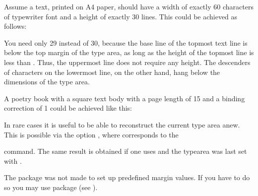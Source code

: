\begin{Example}
  Assume a text, printed on A4 paper, should have a width of exactly 60
  characters of typewriter font and a height of exactly 30 lines. This could
  be achieved as follows:
You need only 29 instead of 30, because the base line of the topmost
text line is  below the top margin of the type area, as
long as the height of the topmost line is less than
. Thus, the uppermost line does not require any
height. The descenders of characters on the lowermost line, on the
other hand, hang below the dimensions of the type area.

\item A poetry book with a square text body with a page length of
  15 and a binding correction of 1 could be
  achieved like this:
\end{Example}
\EndIndexGroup


\begin{Declaration}
\end{Declaration}%
In rare cases it is useful to be able to
reconstruct the current type area anew. This is possible via the option
, where
corresponds to the
\begin{lstcode}
  \areaset[current]{\textwidth}{\textheight}
\end{lstcode}
command. The same result is obtained if one uses
 and the typearea was last set with
.%
%
\EndIndexGroup


The  package was not made to set up predefined
margin values. If you have to do so you may use package
 (see
\cite{package:geometry}).


